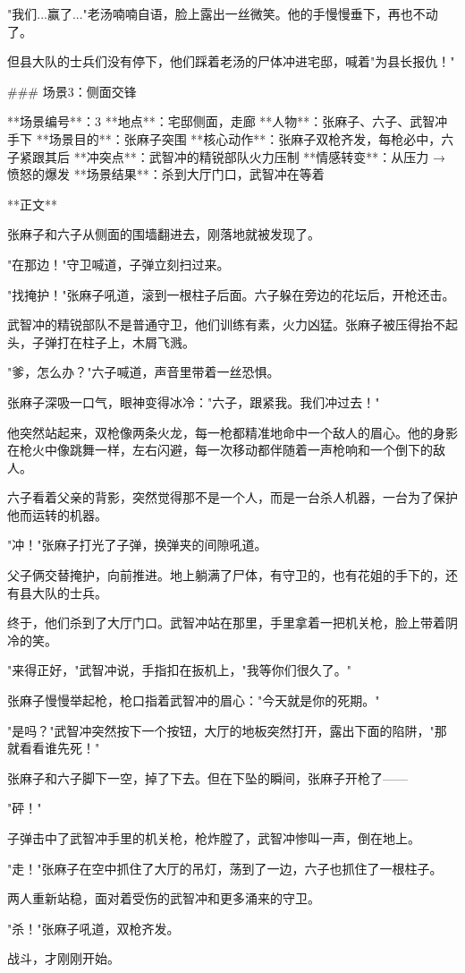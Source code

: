 "我们...赢了..."老汤喃喃自语，脸上露出一丝微笑。他的手慢慢垂下，再也不动了。

但县大队的士兵们没有停下，他们踩着老汤的尸体冲进宅邸，喊着"为县长报仇！"

### 场景3：侧面交锋

**场景编号**：3  
**地点**：宅邸侧面，走廊  
**人物**：张麻子、六子、武智冲手下  
**场景目的**：张麻子突围  
**核心动作**：张麻子双枪齐发，每枪必中，六子紧跟其后  
**冲突点**：武智冲的精锐部队火力压制  
**情感转变**：从压力 → 愤怒的爆发  
**场景结果**：杀到大厅门口，武智冲在等着

**正文**

张麻子和六子从侧面的围墙翻进去，刚落地就被发现了。

"在那边！"守卫喊道，子弹立刻扫过来。

"找掩护！"张麻子吼道，滚到一根柱子后面。六子躲在旁边的花坛后，开枪还击。

武智冲的精锐部队不是普通守卫，他们训练有素，火力凶猛。张麻子被压得抬不起头，子弹打在柱子上，木屑飞溅。

"爹，怎么办？"六子喊道，声音里带着一丝恐惧。

张麻子深吸一口气，眼神变得冰冷："六子，跟紧我。我们冲过去！"

他突然站起来，双枪像两条火龙，每一枪都精准地命中一个敌人的眉心。他的身影在枪火中像跳舞一样，左右闪避，每一次移动都伴随着一声枪响和一个倒下的敌人。

六子看着父亲的背影，突然觉得那不是一个人，而是一台杀人机器，一台为了保护他而运转的机器。

"冲！"张麻子打光了子弹，换弹夹的间隙吼道。

父子俩交替掩护，向前推进。地上躺满了尸体，有守卫的，也有花姐的手下的，还有县大队的士兵。

终于，他们杀到了大厅门口。武智冲站在那里，手里拿着一把机关枪，脸上带着阴冷的笑。

"来得正好，"武智冲说，手指扣在扳机上，"我等你们很久了。"

张麻子慢慢举起枪，枪口指着武智冲的眉心："今天就是你的死期。"

"是吗？"武智冲突然按下一个按钮，大厅的地板突然打开，露出下面的陷阱，"那就看看谁先死！"

张麻子和六子脚下一空，掉了下去。但在下坠的瞬间，张麻子开枪了——

"砰！"

子弹击中了武智冲手里的机关枪，枪炸膛了，武智冲惨叫一声，倒在地上。

"走！"张麻子在空中抓住了大厅的吊灯，荡到了一边，六子也抓住了一根柱子。

两人重新站稳，面对着受伤的武智冲和更多涌来的守卫。

"杀！"张麻子吼道，双枪齐发。

战斗，才刚刚开始。